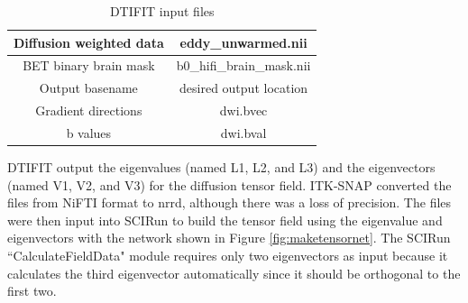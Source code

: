 \begin{table}[H]
\centering
\caption{DTIFIT input files}
\label{tab:dtifit}
\begin{tabular}{|c|c|}
\hline
Diffusion weighted data & eddy\_unwarmed.nii        \\ \hline
BET binary brain mask   & b0\_hifi\_brain\_mask.nii \\ \hline
Output basename          & desired output location   \\ \hline
Gradient directions     & dwi.bvec                  \\ \hline
b values                & dwi.bval                  \\ \hline
\end{tabular}
\end{table}
DTIFIT output the eigenvalues (named L1, L2, and L3) and the eigenvectors (named V1, V2, and V3) for the diffusion tensor field. ITK-SNAP \cite{ref:itksnap} converted the files from NiFTI format to nrrd, although there was a loss of precision. The files were then input into SCIRun to build the tensor field using the eigenvalue and eigenvectors with the network shown in Figure \ref{fig:maketensornet}. The SCIRun ``CalculateFieldData" module requires only two eigenvectors as input because it calculates the third eigenvector automatically since it should be orthogonal to the first two. 

